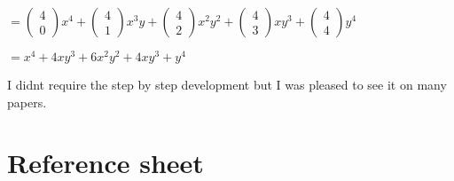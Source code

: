 \documentclass[12pt]{article}
\begin{document}
\begin{enumerate}
$= \left(\begin{array}{c} 4 \\ 0 \end{array}\right)x^{4}+\left(\begin{array}{c} 4 \\ 1 \end{array}\right)x^{3}y+\left(\begin{array}{c} 4 \\ 2 \end{array}\right)x^{2}y^2+\left(\begin{array}{c} 4 \\ 3 \end{array}\right)xy^3+\left(\begin{array}{c} 4 \\ 4\end{array}\right)y^4$

$=x^4 +4xy^3+6x^2y^2+4xy^3+y^4$

I didnt require the step by step development but I was pleased to see it on many papers.




\section{Reference sheet}



\end{enumerate}
\end{document}
